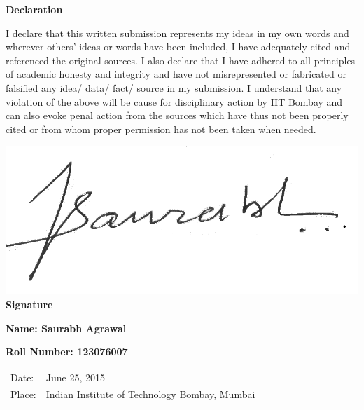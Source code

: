 \newpage
\thispagestyle{empty}
\begin{center}

\large{\huge{\textbf{Declaration}}}\\

\end{center}

\vspace{0.5in}

I declare that this written submission represents my ideas in my own words and wherever others' ideas or words have been included, I have adequately cited and referenced the original sources. I also declare that I have adhered to all principles of academic honesty and integrity and have not misrepresented or fabricated or falsified any idea/ data/ fact/ source in my submission. I understand that any violation of the above will be cause for disciplinary action by IIT Bombay and can also evoke penal action from the sources which have thus not been properly cited or from whom proper permission has not been taken when needed.

\vspace{1.5in}
\begin{flushright}
\includegraphics[scale=0.25]{./figs/signature}\\
\textbf{Signature} \hspace{1.5cm} 
\vspace{1cm}

\textbf{Name: Saurabh Agrawal}
\vspace{1cm}

\textbf{Roll Number: 123076007}
\vspace{1cm}

\end{flushright}

\begin{flushleft}
\begin{tabular}{l l}
Date: & June 25, 2015 \\ \vspace{30pt}
Place: & Indian Institute of Technology Bombay, Mumbai\\
\end{tabular}
\end{flushleft}
